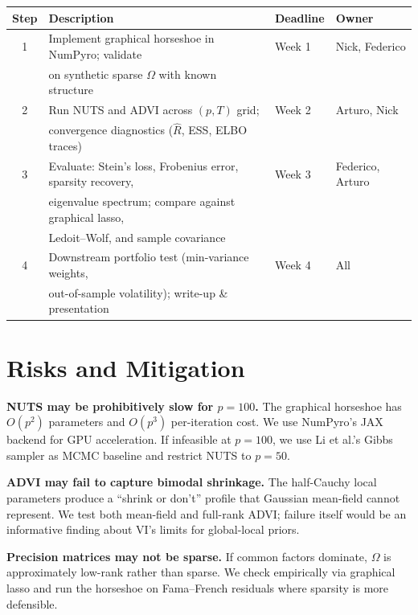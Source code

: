 \documentclass[11pt]{article}
\begin{document}
\vspace{-0.5em}
\begin{table}[h!!]
\centering\small
\begin{tabular}{@{}clll@{}}
\toprule
\textbf{Step} & \textbf{Description} & \textbf{Deadline} & \textbf{Owner} \\
\midrule
1 & Implement graphical horseshoe in NumPyro; validate & Week 1 & Nick, Federico \\
  & on synthetic sparse $\Omega$ with known structure & & \\
\midrule
2 & Run NUTS and ADVI across $(p, T)$ grid; & Week 2 & Arturo, Nick \\
  & convergence diagnostics ($\hat{R}$, ESS, ELBO traces) & & \\
\midrule
3 & Evaluate: Stein's loss, Frobenius error, sparsity recovery, & Week 3 & Federico, Arturo \\
  & eigenvalue spectrum; compare against graphical lasso, & & \\
  & Ledoit--Wolf, and sample covariance & & \\
\midrule
4 & Downstream portfolio test (min-variance weights, & Week 4 & All \\
  & out-of-sample volatility); write-up \& presentation & & \\
\bottomrule
\end{tabular}
\end{table}
\vspace{-0.5em}

\section{Risks and Mitigation}

\textbf{NUTS may be prohibitively slow for $p{=}100$.} The graphical horseshoe has $O(p^2)$ parameters and $O(p^3)$ per-iteration cost. We use NumPyro's JAX backend for GPU acceleration. If infeasible at $p{=}100$, we use Li et al.'s Gibbs sampler as MCMC baseline and restrict NUTS to $p{=}50$.

\textbf{ADVI may fail to capture bimodal shrinkage.} The half-Cauchy local parameters produce a ``shrink or don't'' profile that Gaussian mean-field cannot represent. We test both mean-field and full-rank ADVI; failure itself would be an informative finding about VI's limits for global-local priors.

\textbf{Precision matrices may not be sparse.} If common factors dominate, $\Omega$ is approximately low-rank rather than sparse. We check empirically via graphical lasso and run the horseshoe on Fama--French residuals where sparsity is more defensible.
\end{document}
